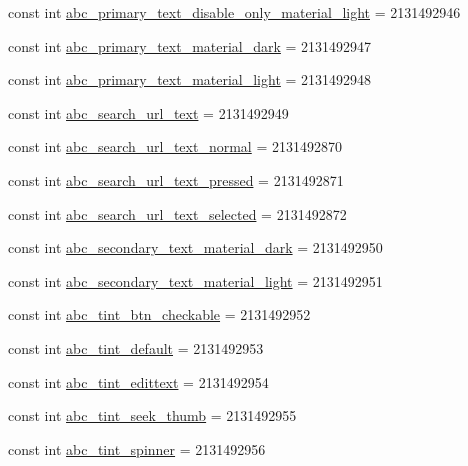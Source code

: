 \begin{CompactItemize}
const int \hyperlink{class__2doo_1_1_droid_1_1_resource_1_1_color_4aef808e1d3851b0798377604746d93a}{abc\_\-primary\_\-text\_\-disable\_\-only\_\-material\_\-light} = 2131492946
\item 
const int \hyperlink{class__2doo_1_1_droid_1_1_resource_1_1_color_fd3f6c0f1dd11dd42655d8ae14ac0b4b}{abc\_\-primary\_\-text\_\-material\_\-dark} = 2131492947
\item 
const int \hyperlink{class__2doo_1_1_droid_1_1_resource_1_1_color_3ed4ba9b359c4e672e10e19ae50b93c7}{abc\_\-primary\_\-text\_\-material\_\-light} = 2131492948
\item 
const int \hyperlink{class__2doo_1_1_droid_1_1_resource_1_1_color_15c74b4ded1cca029f11ec5f87d0177f}{abc\_\-search\_\-url\_\-text} = 2131492949
\item 
const int \hyperlink{class__2doo_1_1_droid_1_1_resource_1_1_color_89fda7375a221f2458112a41bf5b6f43}{abc\_\-search\_\-url\_\-text\_\-normal} = 2131492870
\item 
const int \hyperlink{class__2doo_1_1_droid_1_1_resource_1_1_color_ddb791ff45767c0eec8ecf7411917a3f}{abc\_\-search\_\-url\_\-text\_\-pressed} = 2131492871
\item 
const int \hyperlink{class__2doo_1_1_droid_1_1_resource_1_1_color_23efdebae4ce35a5a33abfdce88d3550}{abc\_\-search\_\-url\_\-text\_\-selected} = 2131492872
\item 
const int \hyperlink{class__2doo_1_1_droid_1_1_resource_1_1_color_ac6186db47023a93aff03d0ea1caa9a3}{abc\_\-secondary\_\-text\_\-material\_\-dark} = 2131492950
\item 
const int \hyperlink{class__2doo_1_1_droid_1_1_resource_1_1_color_5e620a6748326084a1c06f19d07d7eb6}{abc\_\-secondary\_\-text\_\-material\_\-light} = 2131492951
\item 
const int \hyperlink{class__2doo_1_1_droid_1_1_resource_1_1_color_839c24e67bd7fa6cd9ff2cea784e852a}{abc\_\-tint\_\-btn\_\-checkable} = 2131492952
\item 
const int \hyperlink{class__2doo_1_1_droid_1_1_resource_1_1_color_1f7eba9cddeb15db9384d02a07240679}{abc\_\-tint\_\-default} = 2131492953
\item 
const int \hyperlink{class__2doo_1_1_droid_1_1_resource_1_1_color_8e0c815e6eee4331e93b6ad299527d1d}{abc\_\-tint\_\-edittext} = 2131492954
\item 
const int \hyperlink{class__2doo_1_1_droid_1_1_resource_1_1_color_90b7f7dd53007ab97a32854f3f625818}{abc\_\-tint\_\-seek\_\-thumb} = 2131492955
\item 
const int \hyperlink{class__2doo_1_1_droid_1_1_resource_1_1_color_b7a4b52a736c42ef9d9f490b55227085}{abc\_\-tint\_\-spinner} = 2131492956

\end{CompactItemize}
